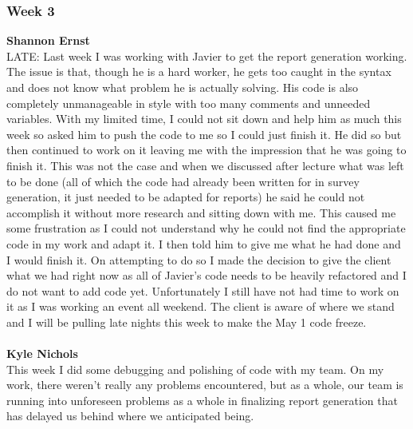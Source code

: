 \documentclass[../final.tex]{subfiles}
\begin{document}
\subsubsection{Week 3}
\textbf{Shannon Ernst}\\
LATE: Last week I was working with Javier to get the report generation working. The issue is that, though he is a hard worker, he gets too caught in the syntax and does not know what problem he is actually solving. His code is also completely unmanageable in style with too many comments and unneeded variables. With my limited time, I could not sit down and help him as much this week so asked him to push the code to me so I could just finish it. He did so but then continued to work on it leaving me with the impression that he was going to finish it. This was not the case and when we discussed after lecture what was left to be done (all of which the code had already been written for in survey generation, it just needed to be adapted for reports) he said he could not accomplish it without more research and sitting down with me. This caused me some frustration as I could not understand why he could not find the appropriate code in my work and adapt it. I then told him to give me what he had done and I would finish it. On attempting to do so I made the decision to give the client what we had right now as all of Javier's code needs to be heavily refactored and I do not want to add code yet. Unfortunately I still have not had time to work on it as I was working an event all weekend. The client is aware of where we stand and I will be pulling late nights this week to make the May 1 code freeze. \\ \\
\textbf{Kyle Nichols}\\
This week I did some debugging and polishing of code with my team. On my work, there weren't really any problems encountered, but as a whole, our team is running into unforeseen problems as a whole in finalizing report generation that has delayed us behind where we anticipated being.
\end{document}
